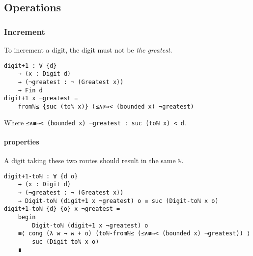 \documentclass[\main/thesis.tex]{subfiles}
\begin{document}
\subsection{Operations}

\subsubsection{Increment}

To increment a digit, the digit must not be \textit{the greatest}.

\begin{lstlisting}
digit+1 : ∀ {d}
    → (x : Digit d)
    → (¬greatest : ¬ (Greatest x))
    → Fin d
digit+1 x ¬greatest =
    fromℕ≤ {suc (toℕ x)} (≤∧≢⇒< (bounded x) ¬greatest)
\end{lstlisting}

Where {\lstinline|≤∧≢⇒< (bounded x) ¬greatest : suc (toℕ x) < d|}.

\paragraph{properties}

\begin{center}
\end{center}

A digit taking these two routes should result in the same {{\lstinline|ℕ|}}.

\begin{lstlisting}[basicstyle=\ttfamily\scriptsize]
digit+1-toℕ : ∀ {d o}
    → (x : Digit d)
    → (¬greatest : ¬ (Greatest x))
    → Digit-toℕ (digit+1 x ¬greatest) o ≡ suc (Digit-toℕ x o)
digit+1-toℕ {d} {o} x ¬greatest =
    begin
        Digit-toℕ (digit+1 x ¬greatest) o
    ≡⟨ cong (λ w → w + o) (toℕ-fromℕ≤ (≤∧≢⇒< (bounded x) ¬greatest)) ⟩
        suc (Digit-toℕ x o)
    ∎
\end{lstlisting}
\end{document}
